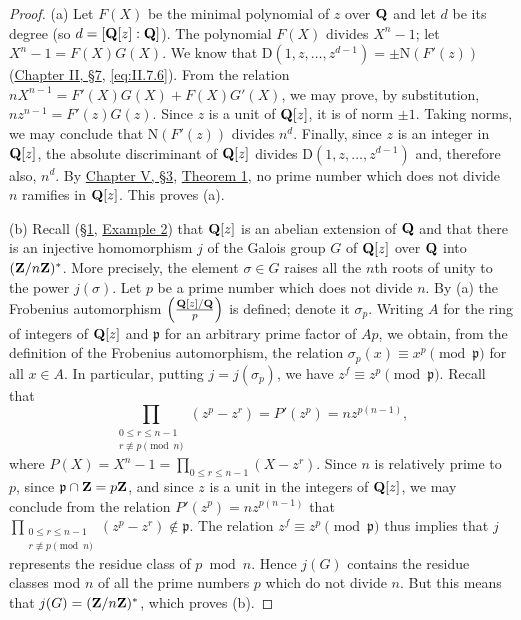 \begin{proof}
(a) Let $F(X)$ be the minimal polynomial of $z$ over $\mathbf{Q}$ and let $d$ be
its degree (so $d=[\mathbf{Q}[z]:\mathbf{Q}]$). The polynomial $F(X)$ divides
$X^{n}-1$; let $X^{n}-1=F(X)G(X)$. We know that
$\mathrm{D}(1,z,\ldots,z^{d-1})=\pm\mathrm{N}(F'(z))$ (\hyperref[sec:2.7]{Chapter II, §7},
\eqref{eq:II.7.6}). From the relation
$nX^{n-1}=F'(X)G(X)+F(X)G'(X)$, we may prove, by substitution,
$nz^{n-1}=F'(z)G(z)$. Since $z$ is a unit of $\mathbf{Q}[z]$, it is of norm
$\pm1$. Taking norms, we may conclude that $\mathrm{N}(F'(z))$ divides
$n^{d}$. Finally, since $z$ is an integer in $\mathbf{Q}[z]$, the absolute
discriminant of $\mathbf{Q}[z]$ divides $\mathrm{D}(1,z,\ldots,z^{d-1})$ and,
therefore also, $n^{d}$. By \hyperref[sec:5.3]{Chapter V, §3}, \hyperref[thm:V.3.1]{Theorem 1}, no prime number
which does not divide $n$ ramifies in $\mathbf{Q}[z]$. This proves (a).

(b) Recall (\hyperref[sec:6.1]{§1}, \hyperref[exa:VI.1.2]{Example 2}) that $\mathbf{Q}[z]$ is an abelian extension of $\mathbf{Q}$
and that there is an injective homomorphism $j$ of the Galois group $G$ of
$\mathbf{Q}[z]$ over $\mathbf{Q}$ into $(\mathbf{Z}/n\mathbf{Z})^{*}$. More precisely, the element
$\sigma\in G$ raises all the $n$th roots of unity to the power
$j(\sigma)$. Let $p$ be a prime number which does not divide $n$. By (a)
the Frobenius automorphism
$\left(\frac{\mathbf{Q}[z]/\mathbf{Q}}{p}\right)$ is defined; denote it $\sigma_{p}$.
Writing $A$ for the ring of integers of $\mathbf{Q}[z]$ and $\mathfrak{p}$ for an
arbitrary prime factor of $Ap$, we obtain, from the definition of the
Frobenius automorphism, the relation
$\sigma_{p}(x)\equiv x^{p}\pmod{\mathfrak{p}}$ for all $x\in A$. In
particular, putting $j=j(\sigma_{p})$, we have
$z^{f}\equiv z^{p}\pmod{\mathfrak{p}}$. Recall that
\[
\prod_{\substack{0\leq r\leq n-1\\ r\not\equiv p\pmod n}}
(z^{p}-z^{r})=P'(z^{p})=nz^{p(n-1)},
\]
where $P(X)=X^{n}-1=\prod_{0\leq r\leq n-1}(X-z^{r})$. Since $n$ is
relatively prime to $p$, since
$\mathfrak{p}\cap\mathbf{Z}=p\mathbf{Z}$, and since $z$ is a unit in the integers of
$\mathbf{Q}[z]$, we may conclude from the relation
$P'(z^{p})=nz^{p(n-1)}$ that
$\prod_{\substack{0\leq r\leq n-1\\ r\not\equiv p\pmod n}}
(z^{p}-z^{r})\notin\mathfrak{p}$. The relation
$z^{f}\equiv z^{p}\pmod{\mathfrak{p}}$ thus implies that $j$ represents
the residue class of $p\bmod n$. Hence $j(G)$ contains the residue
classes mod $n$ of all the prime numbers $p$ which do not divide $n$. But
this means that $j(G)=(\mathbf{Z}/n\mathbf{Z})^{*}$, which proves (b).
\end{proof}

